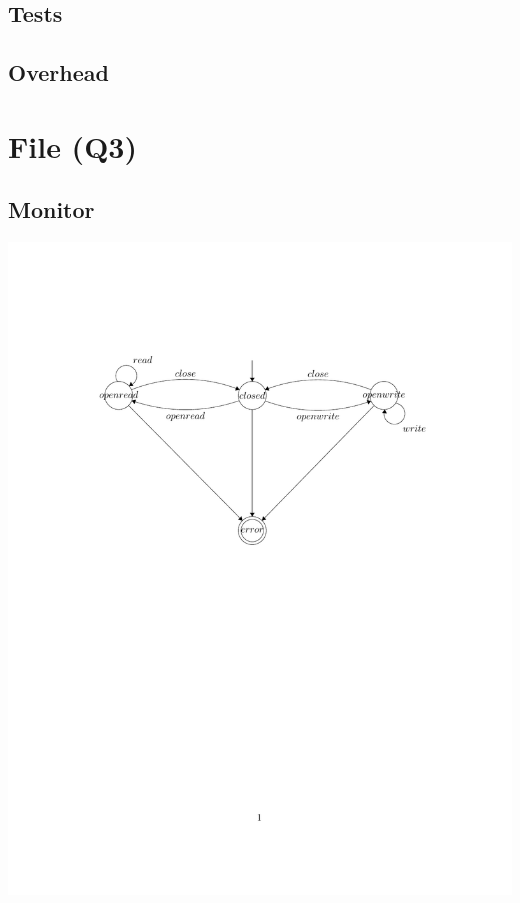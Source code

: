 \documentclass{article}
\begin{document}
\subsection{Tests}

\subsection{Overhead}

\section{File (Q3)}

\subsection{Monitor}

\begin{center}
\includegraphics[width=16cm, clip, trim=3.5cm 14.5cm 3.5cm
4.5cm]{q3.pdf}
\end{center}
\end{document}
